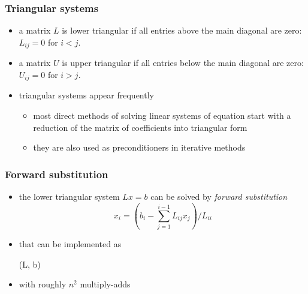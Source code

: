 %
%
%
%


\begin{frame}[fragile]
%
  \frametitle{Triangular systems}
%
  \begin{itemize}
%
  \item a matrix $L$ is lower triangular if all entries above the main diagonal are zero: $L_{ij} =
    0$ for $i < j$.
  \item a matrix $U$ is upper triangular if all entries below the main diagonal are zero: $U_{ij} =
    0$ for $i > j$.
  \item triangular systems appear frequently
    \begin{itemize}
    \item most direct methods of solving linear systems of equation start with a reduction of
      the matrix of coefficients into triangular form
    \item they are also used as preconditioners in iterative methods
    \end{itemize}
%
  \end{itemize}
%
\end{frame}

\begin{frame}[fragile]
%
  \frametitle{Forward substitution}
%
  \begin{itemize}
%
  \item the lower triangular system $Lx = b$ can be solved by {\em forward substitution}
    \begin{equation}
      x_{i} = \left( b_{i} - \sum_{j=1}^{i-1} L_{ij}x_{j} \right) / L_{ii}
    \end{equation}
%
  \item that can be implemented as
    \begin{center}
      \begin{minipage}{.85\linewidth}
        \begin{algorithm}[H]
          \label{alg:forward-substitution}
%
          \DontPrintSemicolon
          \SetAlCapHSkip{0ex}
%
          \caption{\forwsub(L, b)}
%
%
        \end{algorithm}
      \end{minipage}
    \end{center}
%
  \item with roughly $n^{2}$ multiply-adds
%
  \end{itemize}
%
\end{frame}

